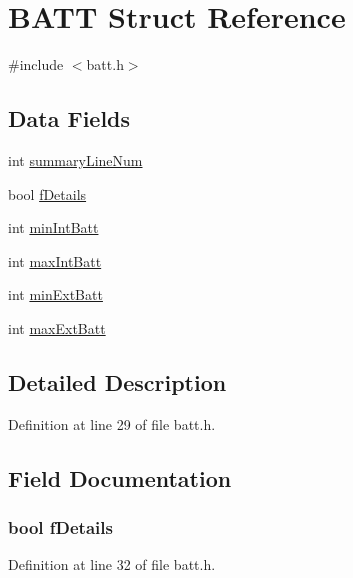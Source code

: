 \hypertarget{struct_b_a_t_t}{
\section{BATT Struct Reference}
\label{struct_b_a_t_t}
}


{\ttfamily \#include $<$batt.h$>$}

\subsection*{Data Fields}
\begin{DoxyCompactItemize}
\item 
int \hyperlink{struct_b_a_t_t_ac7964f3d8bf35ee816b91dd5fb04f3ab}{summaryLineNum}
\item 
bool \hyperlink{struct_b_a_t_t_a9547ec2bc0550a9ff4b65f2eac9945d4}{fDetails}
\item 
int \hyperlink{struct_b_a_t_t_ac2bed0b9f4b76f7d4c426e0641d2ac10}{minIntBatt}
\item 
int \hyperlink{struct_b_a_t_t_a7adb3476743e667b0e908d706265eb3d}{maxIntBatt}
\item 
int \hyperlink{struct_b_a_t_t_a30922e3d48aa62accc6a21485c700ee2}{minExtBatt}
\item 
int \hyperlink{struct_b_a_t_t_ab3e254f1929650c5273b15e435770864}{maxExtBatt}
\end{DoxyCompactItemize}


\subsection{Detailed Description}


Definition at line 29 of file batt.h.



\subsection{Field Documentation}
\hypertarget{struct_b_a_t_t_a9547ec2bc0550a9ff4b65f2eac9945d4}{
\subsubsection[{fDetails}]{\setlength{\rightskip}{0pt plus 5cm}bool {\bf fDetails}}}
\label{struct_b_a_t_t_a9547ec2bc0550a9ff4b65f2eac9945d4}


Definition at line 32 of file batt.h.

